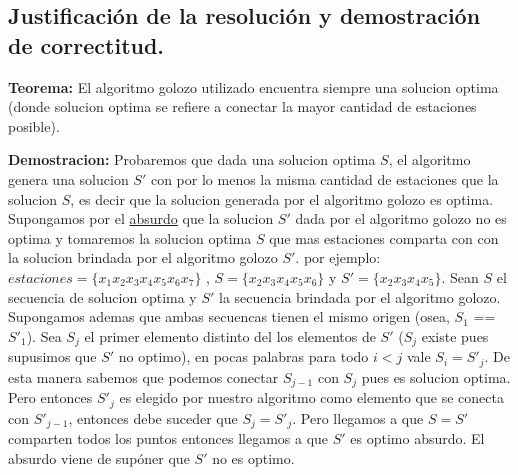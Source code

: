 \newpage
\subsection{Justificación de la resolución y demostración de correctitud.}

\vspace*{0.3cm}

\textbf{Teorema: } El algoritmo golozo utilizado encuentra siempre una solucion optima (donde solucion optima se refiere a conectar la mayor cantidad de estaciones posible).

\textbf{Demostracion: } Probaremos que dada una solucion optima $S$, el algoritmo genera una solucion $S'$ con por lo menos la misma cantidad de estaciones que la solucion $S$, es decir que la solucion generada por el algoritmo golozo es optima. \newline
Supongamos por el \underline{absurdo} que la solucion $S'$ dada por el algoritmo golozo no es optima y tomaremos la solucion optima $S$ que mas estaciones comparta con con la solucion brindada por el algoritmo golozo $S'$.
\newline
por ejemplo: $estaciones = \{x_1 x_2 x_3 x_4 x_5 x_6 x_7 \}$ ,  $S =\{ x_2 x_3 x_4 x_5 x_6\}$  y  $S'=\{ x_2 x_3 x_4 x_5\}$.  
\newline
Sean $S$ el secuencia de solucion optima y $S'$ la secuencia brindada por el algoritmo golozo.
Supongamos ademas que ambas secuencas tienen el mismo origen (osea, $S_1$ == $S'_1$).
Sea $S_j$ el primer elemento distinto del los elementos de $S'$ ($S_j$ existe pues supusimos que $S'$ no optimo), en pocas palabras 
para todo $i<j$ vale $S_i = S'_j$. De esta manera sabemos que podemos conectar $S_{j-1}$ con $S_{j}$ pues es solucion optima.
Pero entonces $S'_j$ es elegido por nuestro algoritmo como elemento que se conecta con $S'_{j-1}$, entonces debe suceder que $S_j = S'_j$.
Pero llegamos a que $S = S'$ comparten todos los puntos entonces llegamos a que $S'$ es optimo absurdo.\newline
El absurdo viene de supóner que $S'$ no es optimo.   	



